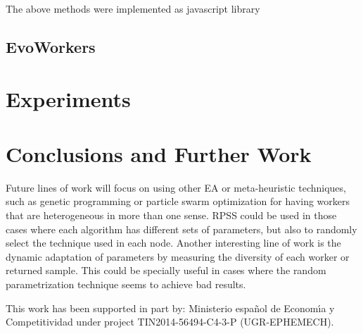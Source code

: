 The above methods were implemented as javascript library   

\subsection{EvoWorkers}
\label{sec:evoworkers}


\section{Experiments}
 \label{sec:experiments}



\section{Conclusions and Further Work}
\label{sec:conclusions}


Future lines of work will focus on using other EA or meta-heuristic techniques, 
such as genetic programming or particle swarm optimization for having 
workers that are heterogeneous in more than one sense. RPSS could be
used in those cases where each algorithm has different sets of
parameters, but also to randomly select the technique used in each
node. Another interesting line of work is the dynamic adaptation of
parameters by measuring the diversity of each worker or returned
sample. This could be specially useful in cases where the random
parametrization technique seems to achieve bad results. 

\begin{acks}
This work has been supported in part by:  Ministerio espa\~{n}ol de
Econom\'{\i}a y Competitividad under project TIN2014-56494-C4-3-P
(UGR-EPHEMECH).
\end{acks}

